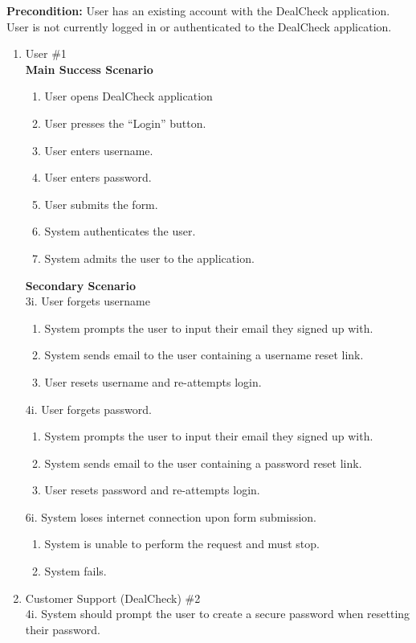 \documentclass[]{article}
\begin{document}
\begin{enumerate}[{\bf {BE}1.}]
	{\bf Precondition:} User has an existing account with the DealCheck application. 
	User is not currently logged in or authenticated to the DealCheck application.
	\begin{enumerate}[{\bf VP1.}]
		\item User \#1 \\
		{\bf Main Success Scenario}
		\begin{enumerate}[1.]
			\item User opens DealCheck application
			\item User presses the “Login” button.
			\item User enters username.
			\item User enters password.
			\item User submits the form.
			\item System authenticates the user.
			\item System admits the user to the application.
		\end{enumerate}
		{\bf Secondary Scenario} \\
		3i. User forgets username
		\begin{enumerate}[{3i}.1]
			\item System prompts the user to input their email they signed up with.
			\item System sends email to the user containing a username reset link.
			\item User resets username and re-attempts login.
		\end{enumerate}
		4i. User forgets password.
		\begin{enumerate}[{4i}.1]
			\item System prompts the user to input their email they signed up with.
			\item System sends email to the user containing a password reset link.
			\item User resets password and re-attempts login.
		\end{enumerate}
		6i. System loses internet connection upon form submission.
		\begin{enumerate}[{6i}.1]
			\item System is unable to perform the request and must stop.
			\item System fails.
		\end{enumerate}
		\item Customer Support (DealCheck) \#2 \\
			4i. System should prompt the user to create a secure password when resetting their password.

\end{enumerate}
\end{enumerate}
\end{document}

